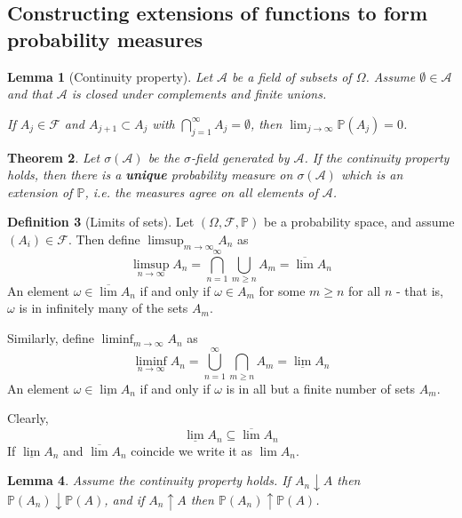 \documentclass[10pt, oneside, reqno]{amsart}
\theoremstyle{plain}%
\newtheorem{thm}{Theorem}[section]
\newtheorem{lem}[thm]{Lemma}
\theoremstyle{definition}
\newtheorem{defn}[thm]{Definition}
\theoremstyle{remark}
\newcommand{\sigf}{\mathcal{F}}
\renewcommand{\P}{\mathbb{P}}
\begin{document}
\subsection{Constructing extensions of functions to form probability measures} %
\label{sub:constructing_extensions_of_functions_to_form_probability_measures}


\begin{lem}[Continuity property]
    Let $\mathcal{A}$ be a field of subsets of $\Omega$.  Assume $\emptyset \in \mathcal{A}$ and that $\mathcal{A}$ is closed under complements and finite unions.

    If $A_j \in \sigf$ and $A_{j+1} \subset A_j$ with $\bigcap_{j=1}^\infty A_j = \emptyset$, then $\lim_{j \rightarrow \infty} \P(A_j) = 0$.
\end{lem}

\begin{thm}
    Let $\sigma( \mathcal{A})$ be the $\sigma$-field generated by $\mathcal{A}$.  If the continuity property holds, then there is a \textbf{unique} probability measure on $\sigma(\mathcal{A})$ which is an extension of $\P$, i.e. the measures agree on all elements of $\mathcal{A}$.  
\end{thm}


\begin{defn}[Limits of sets] Let $(\Omega, \sigf, \P)$ be a probability space, and assume $(A_i) \in \sigf$.  Then define $\limsup_{m \rightarrow \infty} A_n$ as \[
    \limsup_{n \rightarrow \infty} A_n = \bigcap_{n = 1}^\infty \bigcup_{m \geq n} A_m = \overline{\lim} A_n
\] 
An element $\omega \in \overline{\lim} A_n$ if and only if $\omega \in A_m$ for some $m \geq n$ for all $n$ - that is, $\omega$ is in infinitely many of the sets $A_m$.

Similarly, define $\liminf_{m \rightarrow \infty} A_n$ as \[
    \liminf_{n \rightarrow \infty} A_n = \bigcup_{n = 1}^\infty \bigcap_{m \geq n} A_m = \underline{\lim} A_n
\] 
An element $\omega \in \underline{\lim} A_n$ if and only if $\omega$ is in all but a finite number of sets $A_m$.  

Clearly, \[
    \underline{\lim}A_n \subseteq \overline{\lim} A_n
\]
If $\underline{\lim}A_n$ and $\overline{\lim}A_n$ coincide we write it as $\lim A_n$.
\end{defn}

\begin{lem}\label{lem:problim}
    Assume the continuity property holds.  If $A_n \downarrow A$ then $\P(A_n) \downarrow \P(A)$, and if $A_n \uparrow A$ then $\P(A_n) \uparrow \P(A)$. 
    
\end{lem}
\end{document}
